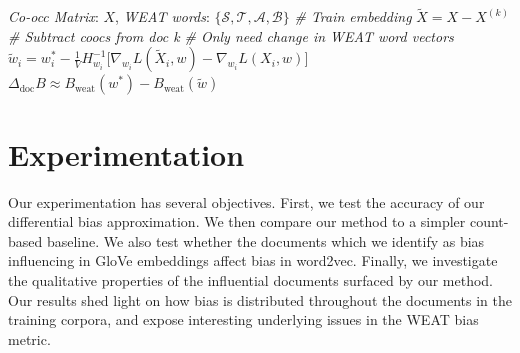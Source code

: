 \documentclass{article}
\begin{document}
\begin{algorithm}
   \caption{Approximating Differential Bias}
   \label{alg:methodology}
\begin{algorithmic}
    \INPUT \textit{Co-occ Matrix}: $X$, \textit{WEAT words}: $\{\mathcal{S}, \mathcal{T}, \mathcal{A}, \mathcal{B}\}$
     \textit{\# Train embedding}
    \STATE $\tilde{X} = X - X^{(k)}$ \textit{\# Subtract coocs from doc k}
    \STATE \textit{\# Only need change in WEAT word vectors}
    \STATE $\tilde{w}_i = w^*_i - \frac{1}{V} H_{w_i}^{-1} \big[\nabla_{w_i} L(\tilde{X}_i, w) - \nabla_{w_i}L(X_i, w)\big]$
    \ENDFOR
    \STATE $\Delta_{\text{doc}} B \approx B_{\text{weat}}(w^*) - B_{\text{weat}}(\tilde{w})$
    \ENDFOR
\end{algorithmic}
\end{algorithm}

\section{Experimentation}
Our experimentation has several objectives. 
First, we test the accuracy of our differential bias approximation.
We then compare our method to a simpler count-based baseline. 
We also test whether the documents which we identify as bias influencing in GloVe embeddings affect bias in word2vec.
Finally, we investigate the qualitative properties of the influential documents surfaced by our method. 
Our results shed light on how bias is distributed throughout the documents in the training corpora, and expose interesting underlying issues in the WEAT bias metric.


\end{document}
